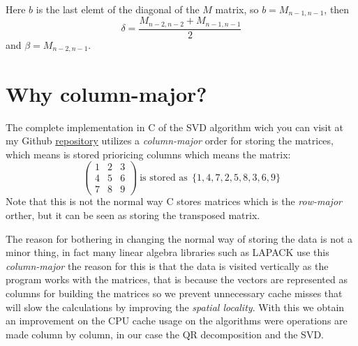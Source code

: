 \documentclass{scrartcl}
\begin{document}
Here $b$ is the last elemt of the diagonal of the $M$ matrix, so $b = M_{n-1,n-1}$, then
\[
\delta = \frac{M_{n-2,n-2} + M_{n-1,n-1}}{2}
\]
and $\beta = M_{n-2,n-1}$.

\section{Why column-major?}

The complete implementation in C of the SVD algorithm wich you can visit at my Github \href{https://github.com/juanyagoc/algebra-svd}{repository} utilizes a \emph{column-major} order for storing the matrices, which means is stored prioricing columns which means the matrix:
\[
 \begin{pmatrix}
    1 & 2 & 3 \\
    4 & 5 & 6 \\
    7 & 8 & 9
 \end{pmatrix} \ \text{is stored as} \ \ \{1,4,7,2,5,8,3,6,9\}
\]
Note that this is not the normal way C stores matrices which is the \emph{row-major} orther, but it can be seen as storing the transposed matrix.

The reason for bothering in changing the normal way of storing the data is not a minor thing, in fact many linear algebra libraries such as LAPACK use this \emph{column-major} the reason for this is that the data is visited vertically as the program works with the matrices, that is because the vectors are represented as columns for building the matrices so we prevent unnecessary cache misses that will slow the calculations by improving the \emph{spatial locality}. With this we obtain an improvement on the CPU cache usage on the algorithms were operations are made column by column, in our case the QR decomposition and the SVD.

\begin{center}
\end{center}
\end{document}
